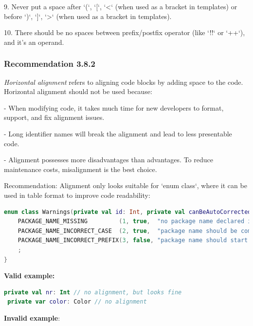 {{{{9. Never put a space after `(`, `[`, `<` (when used as a bracket in templates) or before `)`, `]`, `>` (when used as a bracket in templates).



10. There should be no spaces between prefix/postfix operator (like `!!` or `++`), and it's an operand.



\subsubsection*{\textbf{Recommendation 3.8.2}}
\leavevmode\newline



\textit{Horizontal alignment} refers to aligning code blocks by adding space to the code. Horizontal alignment should not be used because:



- When modifying code, it takes much time for new developers to format, support, and fix alignment issues.

- Long identifier names will break the alignment and lead to less presentable code.

- Alignment possesses more disadvantages than advantages. To reduce maintenance costs, misalignment is the best choice.



Recommendation: Alignment only looks suitable for `enum class`, where it can be used in table format to improve code readability:

\begin{lstlisting}[language=Kotlin]
enum class Warnings(private val id: Int, private val canBeAutoCorrected: Boolean, private val warn: String) : Rule {
    PACKAGE_NAME_MISSING         (1, true,  "no package name declared in a file"),
    PACKAGE_NAME_INCORRECT_CASE  (2, true,  "package name should be completely in a lower case"),
    PACKAGE_NAME_INCORRECT_PREFIX(3, false, "package name should start from company's domain")
    ;
}
\end{lstlisting}


\textbf{Valid example:}

\begin{lstlisting}[language=Kotlin]
 private val nr: Int // no alignment, but looks fine
 private var color: Color // no alignment
\end{lstlisting}


\textbf{Invalid example}:

}}}}
